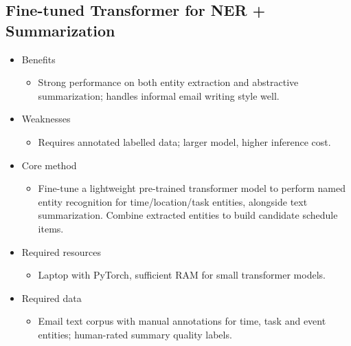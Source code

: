 \documentclass{article}
\begin{document}
\subsection{Fine-tuned Transformer for NER + Summarization}
\begin{itemize}
  \item Benefits
    \begin{itemize}
      \item Strong performance on both entity extraction and abstractive summarization; handles informal email writing style well.
    \end{itemize}
  \item Weaknesses
    \begin{itemize}
      \item Requires annotated labelled data; larger model, higher inference cost.
    \end{itemize}
  \item Core method
    \begin{itemize}
      \item Fine-tune a lightweight pre-trained transformer model to perform named entity recognition for time/location/task entities, alongside text summarization. Combine extracted entities to build candidate schedule items.
    \end{itemize}
  \item Required resources
    \begin{itemize}
      \item Laptop with PyTorch, sufficient RAM for small transformer models.
    \end{itemize}
  \item Required data
    \begin{itemize}
      \item Email text corpus with manual annotations for time, task and event entities; human-rated summary quality labels.
    \end{itemize}
\end{itemize}
\end{document}
